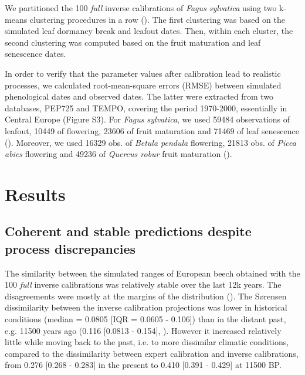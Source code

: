 \documentclass[preprint,12pt,authoryear]{elsarticle}
\begin{document}
We partitioned the 100 \emph{full} inverse calibrations of \emph{Fagus sylvatica} using two k-means clustering procedures in a row (). The first clustering was based on the simulated leaf dormancy break and leafout dates. Then, within each cluster, the second clustering was computed based on the fruit maturation and leaf senescence dates.

In order to verify that the parameter values after calibration lead to realistic processes, we calculated root-mean-square errors (RMSE) between simulated phenological dates and observed dates. The latter were extracted from two databases, PEP725 and TEMPO, covering the period 1970-2000, essentially in Central Europe (Figure S3). For \emph{Fagus sylvatica}, we used 59484 observations of leafout, 10449 of flowering, 23606 of fruit maturation and 71469 of leaf senescence (). Moreover, we used 16329 obs. of \emph{Betula pendula} flowering, 21813 obs. of \emph{Picea abies} flowering and 49236 of \emph{Quercus robur} fruit maturation ().


\section{Results}

\subsection{Coherent and stable predictions despite process discrepancies}

The similarity between the simulated ranges of European beech obtained with the 100 \emph{full} inverse calibrations was relatively stable over the last 12k years. The disagreements were mostly at the margins of the distribution (). The S\o rensen dissimilarity between the inverse calibration projections was lower in historical conditions (median = 0.0805 [IQR = 0.0605 - 0.106]) than in the distant past, e.g. 11500 years ago (0.116 [0.0813 - 0.154], ). However it increased relatively little while moving back to the past, i.e. to more dissimilar climatic conditions, compared to the dissimilarity between expert calibration and inverse calibrations, from 0.276 [0.268 - 0.283] in the present to 0.410 [0.391 - 0.429] at 11500 BP.
\end{document}
